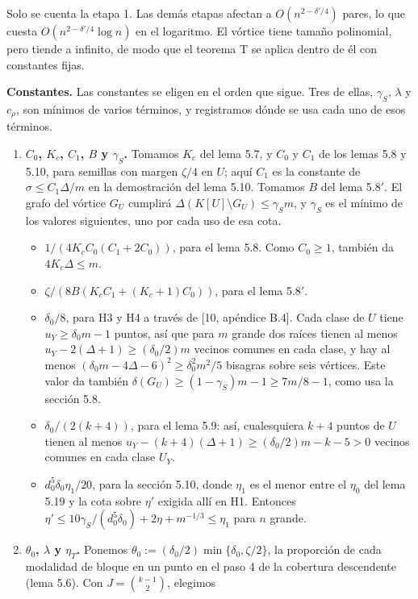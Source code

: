 \documentclass[spanish,11pt,a4paper]{article}
\providecommand{\tightlist}{\setlength{\itemsep}{0pt}\setlength{\parskip}{0pt}}
\begin{document}
Solo se cuenta la etapa 1. Las demás etapas afectan a \(O(n^{2-\delta'/4})\) pares, lo que cuesta \(O(n^{2-\delta'/4}\log n)\) en el logaritmo. El vórtice tiene tamaño polinomial, pero tiende a infinito, de modo que el teorema T se aplica dentro de él con constantes fijas.

\textbf{Constantes.} Las constantes se eligen en el orden que sigue. Tres de ellas, \(\gamma_S\), \(\lambda\) y \(c_\rho\), son mínimos de varios términos, y registramos dónde se usa cada uno de esos términos.

\begin{enumerate}
\def\labelenumi{\arabic{enumi}.}
\item
  \textbf{\(C_0\), \(K_c\), \(C_1\), \(B\) y \(\gamma_S\).} Tomamos \(K_c\) del lema 5.7, y \(C_0\) y \(C_1\) de los lemas 5.8 y 5.10, para semillas con margen \(\zeta/4\) en \(U\); aquí \(C_1\) es la constante de \(\sigma\le C_1\Delta/m\) en la demostración del lema 5.10. Tomamos \(B\) del lema 5.8\('\). El grafo del vórtice \(G_U\) cumplirá \(\Delta(K[U]\setminus G_U)\le\gamma_S m\), y \(\gamma_S\) es el mínimo de los valores siguientes, uno por cada uso de esa cota.

  \begin{itemize}
  \tightlist
  \item
    \(1/(4K_cC_0(C_1+2C_0))\), para el lema 5.8. Como \(C_0\ge1\), también da \(4K_c\Delta\le m\).
  \item
    \(\zeta/(8B(K_cC_1+(K_c+1)C_0))\), para el lema 5.8\('\).
  \item
    \(\delta_0/8\), para H3 y H4 a través de {[}10, apéndice B.4{]}. Cada clase de \(U\) tiene \(u_Y\ge\delta_0m-1\) puntos, así que para \(m\) grande dos raíces tienen al menos \(u_Y-2(\Delta+1)\ge(\delta_0/2)m\) vecinos comunes en cada clase, y hay al menos \((\delta_0m-4\Delta-6)^2\ge\delta_0^2m^2/5\) bisagras sobre seis vértices. Este valor da también \(\delta(G_U)\ge(1-\gamma_S)m-1\ge7m/8-1\), como usa la sección 5.8.
  \item
    \(\delta_0/(2(k+4))\), para el lema 5.9: así, cualesquiera \(k+4\) puntos de \(U\) tienen al menos \(u_Y-(k+4)(\Delta+1)\ge(\delta_0/2)m-k-5>0\) vecinos comunes en cada clase \(U_Y\).
  \item
    \(d_0^5\delta_0\eta_1/20\), para la sección 5.10, donde \(\eta_1\) es el menor entre el \(\eta_0\) del lema 5.19 y la cota sobre \(\eta'\) exigida allí en H1. Entonces \(\eta'\le10\gamma_S/(d_0^5\delta_0)+2\eta+m^{-1/3}\le\eta_1\) para \(n\) grande.
  \end{itemize}
\item
  \textbf{\(\theta_0\), \(\lambda\) y \(\eta_T\).} Ponemos \(\theta_0:=(\delta_0/2)\min\{\delta_0,\zeta/2\}\), la proporción de cada modalidad de bloque en un punto en el paso 4 de la cobertura descendente (lema 5.6). Con \(J=\binom{k-1}{2}\), elegimos


\end{enumerate}
\end{document}
